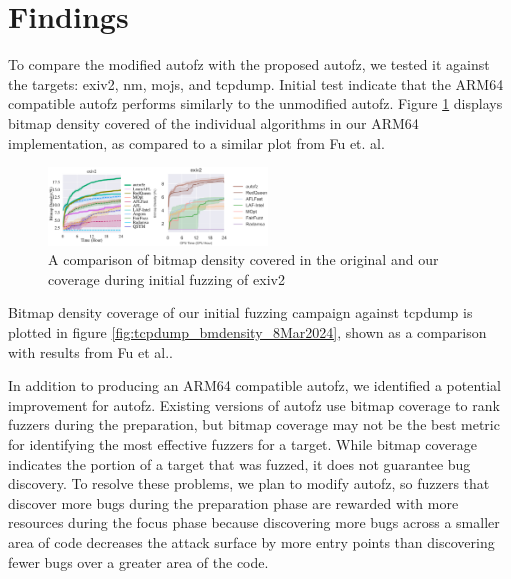 \section{Findings}

To compare the  modified autofz with the proposed autofz, we tested it against the 
targets: exiv2, nm, mojs, and tcpdump. Initial test indicate that the ARM64 compatible 
autofz performs similarly to the unmodified autofz. Figure \ref{fig:exiv2_compare_orig_arm64} 
displays bitmap density covered of the individual algorithms in our ARM64 implementation, 
as compared to a similar plot from Fu et. al\cite{fu_autofz_2023}.

\begin{figure}
    \includegraphics[width=0.52\textwidth]{figs/exiv2_compare_orig_arm64.png}
    \centering
    \caption{A comparison of bitmap density covered in the original\cite{fu_autofz_2023} and our 
    coverage during initial fuzzing of exiv2}
    \label{fig:exiv2_compare_orig_arm64}
\end{figure}

Bitmap density coverage of our initial fuzzing campaign against tcpdump is plotted 
in figure \ref{fig:tcpdump_bmdensity_8Mar2024}, shown as a comparison with results 
from Fu et al.\cite{fu_autofz_2023}.

In addition to producing an ARM64 compatible autofz, we identified a potential improvement for autofz.
Existing versions of autofz use bitmap coverage to rank fuzzers during the preparation, but bitmap
coverage may not be the best metric for identifying the most effective fuzzers for a target. While
bitmap coverage indicates the portion of a target that was fuzzed, it does not guarantee bug discovery.
To resolve these problems, we plan to modify autofz, so fuzzers that discover more bugs during the
preparation phase are rewarded with more resources during the focus phase because discovering more bugs
across a smaller area of code decreases the attack surface by more entry points than discovering fewer
bugs over a greater area of the code.